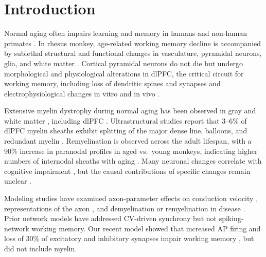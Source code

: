 \documentclass[11pt]{article}
\begin{document}
\section{Introduction}
Normal aging often impairs learning and memory in humans \cite{albert1993neuropsychological,salthouse2003working,fisk2004aging,rhodes2004agerelated,sorel2008aging} and non-human primates \cite{moore2006agerelated,shamy2011nonhuman,moore2017agerelated,comrie2018simple,chang2022dendritic,moore2023agerelated}. In rhesus monkey, age-related working memory decline is accompanied by sublethal structural and functional changes in vasculature, pyramidal neurons, glia, and white matter \cite{hof2004cellular,luebke2010age,peters2012neural,morrison2012ageing}. Cortical pyramidal neurons do not die but undergo morphological and physiological alterations in dlPFC, the critical circuit for working memory, including loss of dendritic spines and synapses \cite{chang2005layer,peters2008loss} and electrophysiological changes in vitro \cite{ibanez2020parallel} and in vivo \cite{wang2011neuronal}.

Extensive myelin dystrophy during normal aging has been observed in gray and white matter \cite{peters2001effect,bowley2010age,peters2007effects}, including dlPFC \cite{peters2002effects,peters2003effects,peters2009effects}. Ultrastructural studies report that 3--6\% of dlPFC myelin sheaths exhibit splitting of the major dense line, balloons, and redundant myelin \cite{peters2002effects}. Remyelination is observed across the adult lifespan, with a 90\% increase in paranodal profiles in aged vs.\ young monkeys, indicating higher numbers of internodal sheaths with aging \cite{peters2003effects}. Many neuronal changes correlate with cognitive impairment \cite{luebke2010age,peters2012neural,shobin2017microglia,dimovasili2022aging}, but the causal contributions of specific changes remain unclear \cite{konar2016age,motley2018selective,cleeland2019agerelated}.

Modeling studies have examined axon-parameter effects on conduction velocity \cite{rushton1951theory,goldman1968computation,brill1977conduction,moore1978simulations,waxman1980determinants,chomiak2009axon}, representations of the axon \cite{blight1985computer,richardson2000modelling,mcintyre2002modeling,gow2008extended,dekker2014conductive}, and demyelination or remyelination in disease \cite{coggan2015imbalance,lasiene2008myelination,powers2012remyelination,scurfield2018diameter}. Prior network models have addressed CV-driven synchrony \cite{pajevic2014role,karimian2019synchronization,noori2020activity,pajevic2023oscillations} but not spiking-network working memory. Our recent model showed that increased AP firing and loss of 30\% of excitatory and inhibitory synapses impair working memory \cite{ibanez2020parallel}, but did not include myelin.
\end{document}
